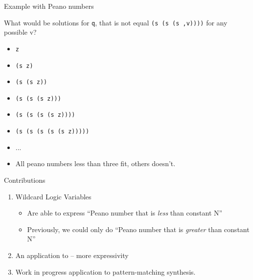 \documentclass[aspectratio=169
  , xcolor={svgnames}
  , hyperref=
      { colorlinks
      , urlcolor=DarkBlue
      }
  , russian  %
  ]{beamer}
\begin{document}
\begin{frame}{Example with Peano numbers}

What would be solutions for \texttt{q}, that is not equal \texttt{(s (s (s ,v))))} for any possible v?

\begin{itemize}
\item[\faGood] \texttt{z}
\item[\faGood] \texttt{(s z)}
\item[\faGood] \texttt{(s (s z))}
\item[\faBad] \texttt{(s (s (s z)))}
\item[\faBad] \texttt{(s (s (s (s z))))}
\item[\faBad] \texttt{(s (s (s (s (s z)))))}
\item ...
\item All peano numbers less than three fit, others doesn't.
\end{itemize}

\end{frame}
\begin{frame}{Contributions}
\begin{enumerate}


\item Wildcard Logic Variables
\begin{itemize}
\item Are able to express ``Peano number that is \emph{less} than constant N''
\item Previously, we could only do ``Peano number that is  \emph{greater} than constant N''
\end{itemize}
\item An application to \noCanren{} -- more expressivity
\item Work in progress application to pattern-matching synthesis.
\end{enumerate}
\end{frame}
\end{document}
